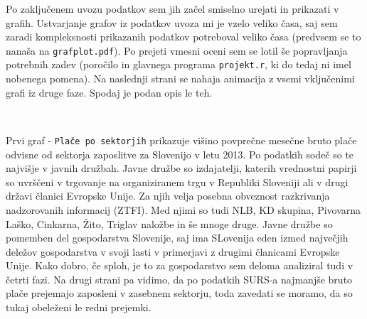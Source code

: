 \documentclass[11pt,a4paper]{article}
\begin{document}
Po zaključenem uvozu podatkov sem jih začel smiselno urejati in prikazati v grafih. Ustvarjanje grafov iz podatkov uvoza mi je vzelo veliko časa, saj sem zaradi kompleksnosti prikazanih podatkov potreboval veliko časa (pred\-vsem se to nanaša na \verb|grafplot.pdf|). Po prejeti vmesni oceni sem se lotil še popravljanja potrebnih zadev (poročilo in glavnega programa \verb|projekt.r|, ki do tedaj ni imel nobenega pomena). Na naslednji strani se nahaja animacija z vsemi vključenimi grafi iz druge faze. Spodaj je podan opis le teh.
% 
% 
% 
% 
% 
% 
% 
% 
% 
% 
% 
% 
% 
% 
% 

\begin{center}
\\
\end{center}

Prvi graf - \verb|Plače po sektorjih| prikazuje višino povprečne mesečne bru\-to plače odvisne od sektorja zaposlitve za Slovenijo v letu 2013. Po podatkih sodeč so te najvišje v javnih družbah. Javne družbe so izdajatelji, katerih vrednostni papirji so uvrščeni v trgovanje na organiziranem trgu v Republiki Sloveniji ali v drugi državi članici Evropske Unije. Za njih velja posebna obveznost razkrivanja nadzorovanih informacij (ZTFI). Med njimi so tudi NLB, KD skupina, Pivovarna Laško, Cinkarna, Žito, Triglav naložbe in še mnoge druge. Javne družbe so pomemben del gospodarstva Slovenije, saj ima SLovenija eden izmed največjih deležov gospodarstva v svoji lasti v primerjavi z drugimi članicami Evropske Unije. Kako dobro, če sploh, je to za gospodarstvo sem deloma analiziral tudi v četrti fazi. Na drugi strani pa vidimo, da po podatkih SURS-a najmanjše bruto plače prejemajo zaposleni v zasebnem sektorju, toda zavedati se moramo, da so tukaj obeleženi le redni prejemki.
\end{document}
